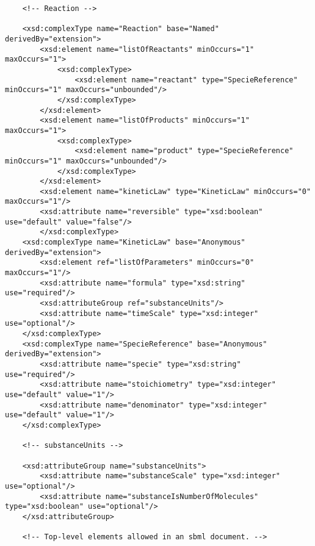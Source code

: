 \documentclass[10pt]{article}
\begin{document}
\begin{small}
\begin{verbatim}
    <!-- Reaction -->

    <xsd:complexType name="Reaction" base="Named" derivedBy="extension">
        <xsd:element name="listOfReactants" minOccurs="1" maxOccurs="1">
            <xsd:complexType>
                <xsd:element name="reactant" type="SpecieReference" minOccurs="1" maxOccurs="unbounded"/>
            </xsd:complexType>
        </xsd:element>
        <xsd:element name="listOfProducts" minOccurs="1" maxOccurs="1">
            <xsd:complexType>
                <xsd:element name="product" type="SpecieReference" minOccurs="1" maxOccurs="unbounded"/>
            </xsd:complexType>
        </xsd:element>
        <xsd:element name="kineticLaw" type="KineticLaw" minOccurs="0" maxOccurs="1"/>
        <xsd:attribute name="reversible" type="xsd:boolean" use="default" value="false"/>
        </xsd:complexType>
    <xsd:complexType name="KineticLaw" base="Anonymous" derivedBy="extension">
        <xsd:element ref="listOfParameters" minOccurs="0" maxOccurs="1"/>
        <xsd:attribute name="formula" type="xsd:string" use="required"/>
        <xsd:attributeGroup ref="substanceUnits"/>
        <xsd:attribute name="timeScale" type="xsd:integer" use="optional"/>
    </xsd:complexType>
    <xsd:complexType name="SpecieReference" base="Anonymous" derivedBy="extension">
        <xsd:attribute name="specie" type="xsd:string" use="required"/>
        <xsd:attribute name="stoichiometry" type="xsd:integer" use="default" value="1"/>
        <xsd:attribute name="denominator" type="xsd:integer" use="default" value="1"/>
    </xsd:complexType>

    <!-- substanceUnits -->

    <xsd:attributeGroup name="substanceUnits">
        <xsd:attribute name="substanceScale" type="xsd:integer" use="optional"/>
        <xsd:attribute name="substanceIsNumberOfMolecules" type="xsd:boolean" use="optional"/>
    </xsd:attributeGroup>

    <!-- Top-level elements allowed in an sbml document. -->


\end{verbatim}
\end{small}
\end{document}
